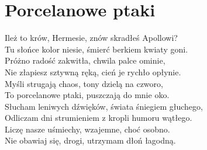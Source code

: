 \documentclass[12pt, a4paper]{memoir}
\renewenvironment{verse}{%
  \par\vspace{\baselineskip}\raggedright
}{
  \par\vspace{\baselineskip}
}
\begin{document}
\section{Porcelanowe ptaki}
\begin{verse}
Ileż to krów, Hermesie, znów skradłeś Apollowi?\\
Tu słońce kolor niesie, śmierć berkiem kwiaty goni.\\
Próżno radość zakwitła, chwila palce ominie,\\
Nie złapiesz sztywną ręką, cień je rychło opłynie.\\[\baselineskip]

Myśli strugają chaos, tony dzielą na czworo,\\
To porcelanowe ptaki, puszczają do mnie oko.\\
Słucham leniwych dźwięków, świata śniegiem głuchego,\\
Odliczam dni strumieniem z kropli humoru wątłego.\\[\baselineskip]

Liczę nasze uśmiechy, wzajemne, choć osobno.\\
Nie obawiaj się, drogi, utrzymam dłoń łagodną.
\end{verse}

\clearpage
\end{document}
